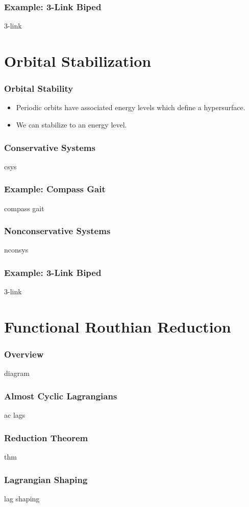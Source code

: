 \documentclass{beamer}
\begin{document}
\begin{frame}
  \frametitle{Example: 3-Link Biped}
  3-link
\end{frame}

\section{Orbital Stabilization}
\begin{frame}
  \frametitle{Orbital Stability}
  \begin{itemize}
  \item Periodic orbits have associated energy levels which define a hypersurface.
  \item We can stabilize to an energy level.
  \end{itemize}
\end{frame}

\begin{frame}
  \frametitle{Conservative Systems}
  csys
\end{frame}

\begin{frame}
  \frametitle{Example: Compass Gait}
  compass gait
\end{frame}

\begin{frame}
  \frametitle{Nonconservative Systems}
  nconsys
\end{frame}

\begin{frame}
  \frametitle{Example: 3-Link Biped}
  3-link
\end{frame}

\section{Functional Routhian Reduction}
\begin{frame}
  \frametitle{Overview}
  diagram
\end{frame}

\begin{frame}
  \frametitle{Almost Cyclic Lagrangians}
  ac lags
\end{frame}

\begin{frame}
  \frametitle{Reduction Theorem}
  thm
\end{frame}

\begin{frame}
  \frametitle{Lagrangian Shaping}
  lag shaping
\end{frame}
\end{document}
